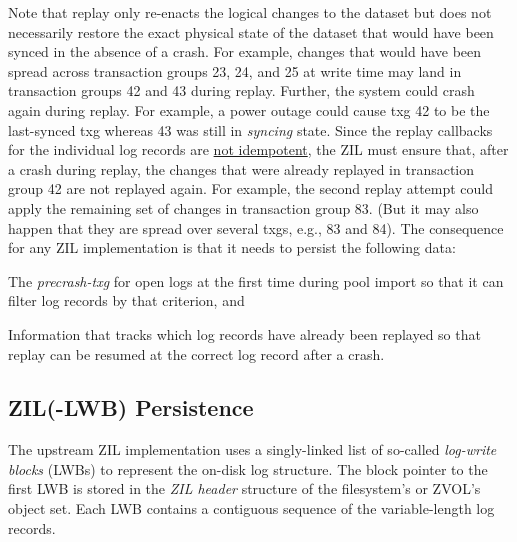 \documentclass[12pt,a4paper,twoside]{book}
\begin{document}
Note that replay only re-enacts the logical changes to the dataset but does not necessarily restore the exact physical state of the dataset that would have been synced in the absence of a crash.
For example, changes that would have been spread across transaction groups 23, 24, and 25 at write time may land in transaction groups 42 and 43 during replay.
Further, the system could crash again during replay.
For example, a power outage could cause txg 42 to be the last-synced txg whereas 43 was still in \textit{syncing} state.
Since the replay callbacks for the individual log records are \underline{not idempotent}, the ZIL must ensure that, after a crash during replay, the changes that were already replayed in transaction group 42 are not replayed again.
For example, the second replay attempt could apply the remaining set of changes in transaction group 83.
(But it may also happen that they are spread over several txgs, e.g., 83 and 84).
The consequence for any ZIL implementation is that it needs to persist the following data:
\begin{description}[noitemsep,leftmargin=1.5cm,labelindent=1cm]
    \item[Precrash-txg] The \textit{precrash-txg} for open logs at the first time during pool import so that it can filter log records by that criterion, and
    \item[Replay progress] Information that tracks which log records have already been replayed so that replay can be resumed at the correct log record after a crash.
\end{description}

\subsection{ZIL(-LWB) Persistence}\label{ch:openzfs_background:zillwb_persistence}

The upstream ZIL implementation uses a singly-linked list of so-called \textit{log-write blocks} (LWBs) to represent the on-disk log structure.
The block pointer to the first LWB is stored in the \textit{ZIL header} structure of the filesystem's or ZVOL's object set.
Each LWB contains a contiguous sequence of the variable-length log records.
\end{document}
